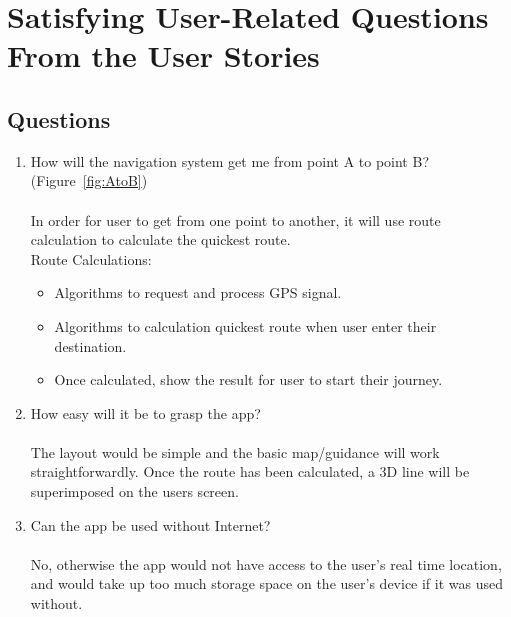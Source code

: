 \newpage

\section{Satisfying User-Related Questions From the User Stories}
\subsection*{Questions}
\begin{enumerate}
    \item How will the navigation system get me from point A to point B? (Figure~\ref{fig:AtoB})\\\\
    In order for user to get from one point to another, it will use route calculation to calculate the quickest route.\\
    Route Calculations:
    \begin{itemize}
        \item Algorithms to request and process GPS signal.
        \item Algorithms to calculation quickest route when user enter their destination.
        \item Once calculated, show the result for user to start their journey.
    \end{itemize}
    
    \item How easy will it be to grasp the app?\\\\
    The layout would be simple and the basic map/guidance will work straightforwardly. Once the route has been calculated, a 3D line will be superimposed on the users screen.
    
    \item Can the app be used without Internet? \\\\
    No, otherwise the app would not have access to the user's real time location, and would take up too much storage space on the user's device if it was used without.
\end{enumerate}